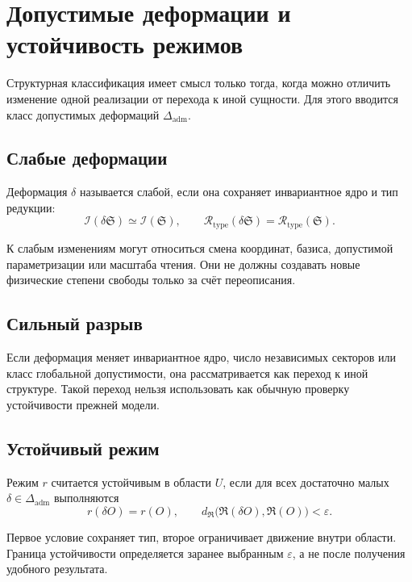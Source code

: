 \chapter{Допустимые деформации и устойчивость режимов}

Структурная классификация имеет смысл только тогда, когда можно отличить
изменение одной реализации от перехода к иной сущности. Для этого вводится
класс допустимых деформаций $\Delta_{\mathrm{adm}}$.

\section{Слабые деформации}

Деформация $\delta$ называется слабой, если она сохраняет инвариантное ядро и
тип редукции:
\begin{equation}
 \mathcal I(\delta\mathfrak S)\simeq\mathcal I(\mathfrak S),
 \qquad
 \mathcal R_{\mathrm{type}}(\delta\mathfrak S)=
 \mathcal R_{\mathrm{type}}(\mathfrak S).
\end{equation}

К слабым изменениям могут относиться смена координат, базиса, допустимой
параметризации или масштаба чтения. Они не должны создавать новые физические
степени свободы только за счёт переописания.

\section{Сильный разрыв}

Если деформация меняет инвариантное ядро, число независимых секторов или класс
глобальной допустимости, она рассматривается как переход к иной структуре.
Такой переход нельзя использовать как обычную проверку устойчивости прежней
модели.

\section{Устойчивый режим}

Режим $r$ считается устойчивым в области $U$, если для всех достаточно малых
$\delta\in\Delta_{\mathrm{adm}}$ выполняются
\begin{equation}
 r(\delta O)=r(O),
 \qquad
 d_{\mathfrak R}\bigl(\mathfrak R(\delta O),\mathfrak R(O)\bigr)<\varepsilon.
\end{equation}

Первое условие сохраняет тип, второе ограничивает движение внутри области.
Граница устойчивости определяется заранее выбранным $\varepsilon$, а не после
получения удобного результата.

